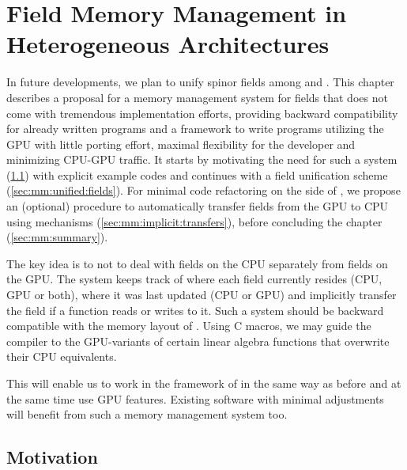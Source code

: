 \chapter{Field Memory Management in Heterogeneous Architectures}
\label{ch:p1:memory}


In future developments, we plan to unify spinor fields among \openqxd and \quda.
This chapter describes a proposal for a memory management system for fields that does not come with tremendous implementation efforts, providing backward compatibility for already written programs and a framework to write programs utilizing the GPU with little porting effort, maximal flexibility for the developer and minimizing CPU-GPU traffic.
It starts by motivating the need for such a system (\cref{sec:mm:motivation}) with explicit example codes and continues with a field unification scheme (\cref{sec:mm:unified:fields}).
For minimal code refactoring on the side of \openqxd, we propose an (optional) procedure to automatically transfer fields from the GPU to CPU using \posix mechanisms (\cref{sec:mm:implicit:transfers}), before concluding the chapter (\cref{sec:mm:summary}).

The key idea is to not to deal with fields on the CPU separately from fields on the GPU.
The system  keeps track of where each field currently resides (CPU, GPU or both), where it was last updated (CPU or GPU) and implicitly transfer the field if a function reads or writes to it.
Such a system should be backward compatible with the memory layout of \openqxd.
Using C macros, we may guide the compiler to the GPU-variants of certain linear algebra functions that overwrite their CPU equivalents.

This will enable us to work in the framework of \openqxd in the same way as before and at the same time use GPU features. 
Existing software with minimal adjustments will benefit from such a memory management system too.

\section{Motivation}
\label{sec:mm:motivation}

